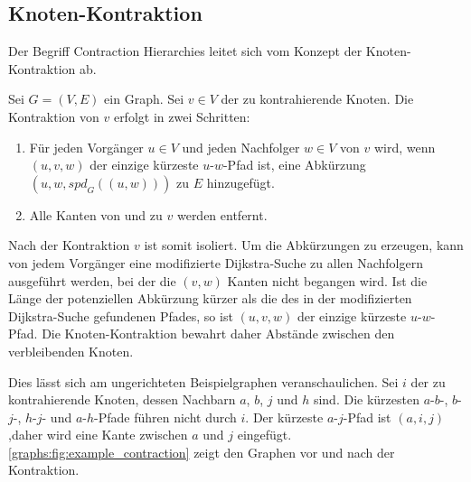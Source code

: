\subsection{Knoten-Kontraktion}

Der Begriff Contraction Hierarchies leitet sich vom Konzept der Knoten-Kontraktion ab.

\begin{definition}
  Sei $G = (V, E)$ ein Graph. Sei $v \in V$ der zu kontrahierende Knoten. Die Kontraktion von $v$ erfolgt in zwei Schritten:

  \begin{enumerate}
    \item\label{ch:contraction:when_shortcut}
    Für jeden Vorgänger $u \in V$ und jeden Nachfolger $w \in V$ von $v$ wird, wenn $(u, v, w)$ der einzige kürzeste $u$-$w$-Pfad ist, eine Abkürzung $(u, w, {spd}_G((u, w)))$ zu $E$ hinzugefügt.

    \item
          Alle Kanten von und zu $v$ werden entfernt.
  \end{enumerate}
\end{definition}

Nach der Kontraktion $v$ ist somit isoliert.
Um die Abkürzungen zu erzeugen, kann von jedem Vorgänger eine modifizierte Dijkstra-Suche zu allen Nachfolgern ausgeführt werden, bei der die $(v, w)$ Kanten nicht begangen wird.
Ist die Länge der potenziellen Abkürzung kürzer als die des in der modifizierten Dijkstra-Suche gefundenen Pfades, so ist $(u, v, w)$ der einzige kürzeste $u$-$w$-Pfad.
Die Knoten-Kontraktion bewahrt daher Abstände zwischen den verbleibenden Knoten.

Dies lässt sich am ungerichteten Beispielgraphen veranschaulichen.
Sei $i$ der zu kontrahierende Knoten, dessen Nachbarn $a$, $b$, $j$ und $h$ sind.
Die kürzesten $a$-$b$-, $b$-$j$-, $h$-$j$- und $a$-$h$-Pfade führen nicht durch $i$.
Der kürzeste $a$-$j$-Pfad ist $(a, i, j)$,daher wird eine Kante zwischen $a$ und $j$ eingefügt.
\autoref{graphs:fig:example_contraction} zeigt den Graphen vor und nach der Kontraktion.

